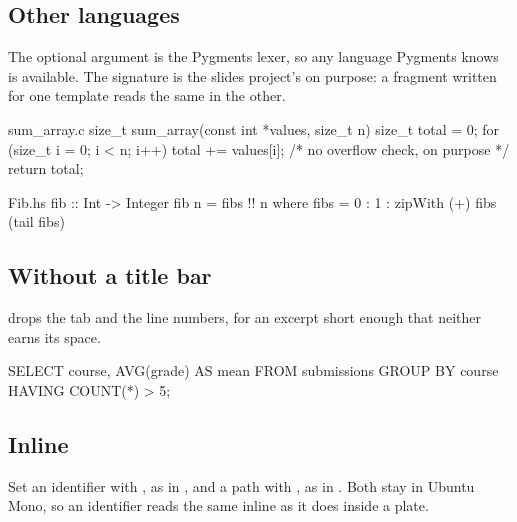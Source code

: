 \subsection{Other languages}

The optional argument is the Pygments lexer, so any language Pygments knows is available.
The signature is the slides project's on purpose: a fragment written for one template reads the same in the other.

\begin{codebox}[c]{sum_array.c}
size_t sum_array(const int *values, size_t n) {
    size_t total = 0;
    for (size_t i = 0; i < n; i++) {
        total += values[i];  /* no overflow check, on purpose */
    }
    return total;
}
\end{codebox}

\begin{codebox}[haskell]{Fib.hs}
fib :: Int -> Integer
fib n = fibs !! n
  where fibs = 0 : 1 : zipWith (+) fibs (tail fibs)
\end{codebox}

\subsection{Without a title bar}

 drops the tab and the line numbers, for an excerpt short enough that neither earns its space.

\begin{codeplain}[sql]
SELECT course, AVG(grade) AS mean
  FROM submissions
 GROUP BY course
HAVING COUNT(*) > 5;
\end{codeplain}

\subsection{Inline}

Set an identifier with , as in , and a path with , as in .
Both stay in Ubuntu Mono, so an identifier reads the same inline as it does inside a plate.
